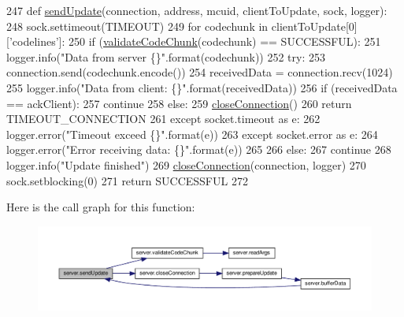 \begin{DoxyCode}
247 \textcolor{keyword}{def }\hyperlink{namespaceserver_a4889d0db3f3503cc61340252fabc2c24}{sendUpdate}(connection, address, mcuid, clientToUpdate, sock, logger):
248      sock.settimeout(TIMEOUT)
249      \textcolor{keywordflow}{for} codechunk \textcolor{keywordflow}{in} clientToUpdate[0][\textcolor{stringliteral}{'codelines'}]:
250           \textcolor{keywordflow}{if} (\hyperlink{namespaceserver_ad6f5a9a8c8e233d0537dc69dc6de98f6}{validateCodeChunk}(codechunk) == SUCCESSFUL):
251                logger.info(\textcolor{stringliteral}{"Data from server \{\}"}.format(codechunk))
252                \textcolor{keywordflow}{try}:
253                     connection.send(codechunk.encode())
254                     receivedData = connection.recv(1024)
255                     logger.info(\textcolor{stringliteral}{"Data from client: \{\}"}.format(receivedData))
256                     \textcolor{keywordflow}{if} (receivedData == ackClient):
257                          \textcolor{keywordflow}{continue}
258                     \textcolor{keywordflow}{else}:
259                          \hyperlink{namespaceserver_a2e99d18201fed087163454b021b7c007}{closeConnection}()
260                          \textcolor{keywordflow}{return} TIMEOUT\_CONNECTION
261                \textcolor{keywordflow}{except} socket.timeout \textcolor{keyword}{as} e:
262                          logger.error(\textcolor{stringliteral}{"Timeout exceed \{\}"}.format(e))
263                \textcolor{keywordflow}{except} socket.error \textcolor{keyword}{as} e:
264                     logger.error(\textcolor{stringliteral}{"Error receiving data: \{\}"}.format(e))
265                     
266           \textcolor{keywordflow}{else}:
267                \textcolor{keywordflow}{continue} 
268      logger.info(\textcolor{stringliteral}{"Update finished"})
269      \hyperlink{namespaceserver_a2e99d18201fed087163454b021b7c007}{closeConnection}(connection, logger)
270      sock.setblocking(0)
271      \textcolor{keywordflow}{return} SUCCESSFUL
272 
\end{DoxyCode}
Here is the call graph for this function\+:
\nopagebreak
\begin{figure}[H]
\begin{center}
\leavevmode
\includegraphics[width=350pt]{namespaceserver_a4889d0db3f3503cc61340252fabc2c24_cgraph}
\end{center}
\end{figure}
